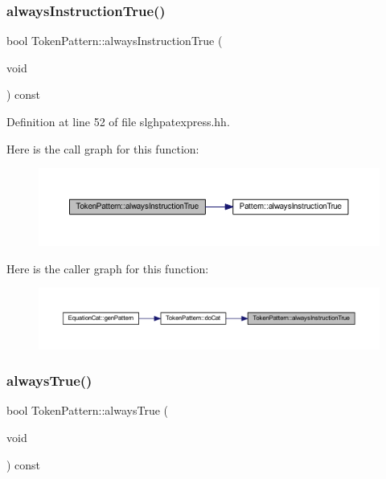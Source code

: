 \subsubsection{\texorpdfstring{alwaysInstructionTrue()}{alwaysInstructionTrue()}}
{\footnotesize\ttfamily bool Token\+Pattern\+::always\+Instruction\+True (\begin{DoxyParamCaption}\item[{void}]{ }\end{DoxyParamCaption}) const\hspace{0.3cm}{\ttfamily [inline]}}



Definition at line 52 of file slghpatexpress.\+hh.

Here is the call graph for this function\+:
\nopagebreak
\begin{figure}[H]
\begin{center}
\leavevmode
\includegraphics[width=350pt]{class_token_pattern_ab58b4509cd534fa626618afd06cd37cd_cgraph}
\end{center}
\end{figure}
Here is the caller graph for this function\+:
\nopagebreak
\begin{figure}[H]
\begin{center}
\leavevmode
\includegraphics[width=350pt]{class_token_pattern_ab58b4509cd534fa626618afd06cd37cd_icgraph}
\end{center}
\end{figure}
\mbox{\label{class_token_pattern_a0a1c7d3ae8b9964908decdcd5c8e2e47}} 
\subsubsection{\texorpdfstring{alwaysTrue()}{alwaysTrue()}}
{\footnotesize\ttfamily bool Token\+Pattern\+::always\+True (\begin{DoxyParamCaption}\item[{void}]{ }\end{DoxyParamCaption}) const\hspace{0.3cm}{\ttfamily [inline]}}



